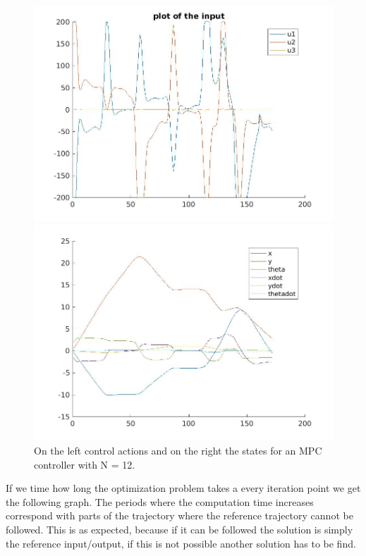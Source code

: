 \documentclass[•]{article}
\begin{document}
\begin{figure}[H]
\begin{minipage}{.45\textwidth}
\includegraphics[width = \textwidth]{mpcinput12.jpg}
\end{minipage}
\begin{minipage}{.45\textwidth}
\includegraphics[width = \textwidth]{mpcstates12.jpg}
\end{minipage}
\caption{On the left control actions and on the right the states for an MPC controller with N = 12. }
\end{figure}

If we time how long the optimization problem takes a every iteration point we get the following graph. The periods where the computation time increases correspond with parts of the trajectory where the reference trajectory cannot be followed. This is as expected, because if it can be followed the solution is simply the reference input/output, if this is not possible another solution has to be find.
\end{document}
